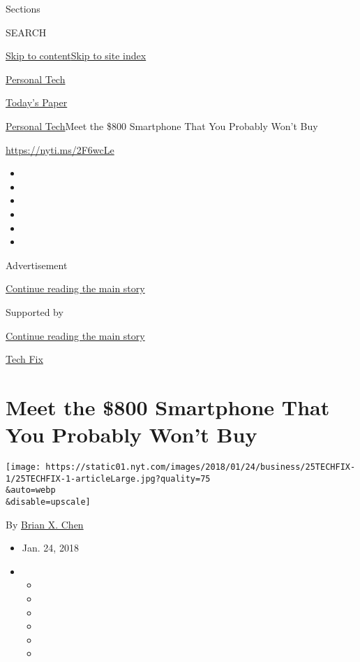 Sections

SEARCH

\protect\hyperlink{site-content}{Skip to
content}\protect\hyperlink{site-index}{Skip to site index}

\href{https://www.nytimes.com/section/technology/personaltech}{Personal
Tech}

\href{https://myaccount.nytimes.com/auth/login?response_type=cookie\&client_id=vi}{}

\href{https://www.nytimes.com/section/todayspaper}{Today's Paper}

\href{/section/technology/personaltech}{Personal Tech}\textbar{}Meet the
\$800 Smartphone That You Probably Won't Buy

\url{https://nyti.ms/2F6wcLe}

\begin{itemize}
\item
\item
\item
\item
\item
\item
\end{itemize}

Advertisement

\protect\hyperlink{after-top}{Continue reading the main story}

Supported by

\protect\hyperlink{after-sponsor}{Continue reading the main story}

\href{/column/tech-fix}{Tech Fix}

\hypertarget{meet-the-800-smartphone-that-you-probably-wont-buy}{%
\section{Meet the \$800 Smartphone That You Probably Won't
Buy}\label{meet-the-800-smartphone-that-you-probably-wont-buy}}

\texttt{[image: https://static01.nyt.com/images/2018/01/24/business/25TECHFIX-1/25TECHFIX-1-articleLarge.jpg?quality=75\\\&auto=webp\\\&disable=upscale]}

By \href{http://www.nytimes.com/by/brian-x-chen}{Brian X. Chen}

\begin{itemize}
\item
  Jan. 24, 2018
\item
  \begin{itemize}
  \item
  \item
  \item
  \item
  \item
  \item
  \end{itemize}
\end{itemize}

